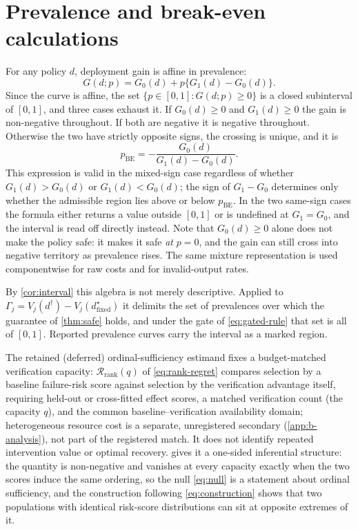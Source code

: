 \section{Prevalence and break-even calculations}
\label{app:estimands}

For any policy $d$, deployment gain is affine in prevalence:
\begin{equation}
 G(d;p)=G_0(d)+p\{G_1(d)-G_0(d)\}.
\end{equation}
Since the curve is affine, the set $\{p\in[0,1]:G(d;p)\ge0\}$ is a closed
subinterval of $[0,1]$, and three cases exhaust it.  If $G_0(d)\ge0$ and
$G_1(d)\ge0$ the gain is non-negative throughout.  If both are negative it is
negative throughout.  Otherwise the two have strictly opposite signs, the
crossing is unique, and it is
\begin{equation}
 p_{\mathrm{BE}}=-\frac{G_0(d)}{G_1(d)-G_0(d)}.
\end{equation}
This expression is valid in the mixed-sign case regardless of whether
$G_1(d)>G_0(d)$ or $G_1(d)<G_0(d)$; the sign of $G_1-G_0$ determines only
whether the admissible region lies above or below $p_{\mathrm{BE}}$.  In the
two same-sign cases the formula either returns a value outside $[0,1]$ or is
undefined at $G_1=G_0$, and the interval is read off directly instead.  Note
that $G_0(d)\ge0$ alone does not make the policy safe: it makes it safe
\emph{at} $p=0$, and the gain can still cross into negative territory as
prevalence rises.  The same mixture representation is used componentwise for raw costs
and for invalid-output rates.

By \cref{cor:interval} this algebra is not merely descriptive.  Applied to
$\Gamma_j=V_j(d^\dagger)-V_j(d^\star_{\mathrm{fixed}})$ it delimits the set of
prevalences over which the guarantee of \cref{thm:safe} holds, and
under the gate of \eqref{eq:gated-rule} that set is all of $[0,1]$.  Reported
prevalence curves carry the interval as a marked region.

The retained (deferred) ordinal-sufficiency estimand fixes a budget-matched verification
capacity: $\mathcal R_{\mathrm{rank}}(q)$ of \eqref{eq:rank-regret} compares
selection by a baseline failure-risk score against selection by the verification
advantage itself, requiring held-out or cross-fitted effect scores, a matched verification
count (the capacity $q$), and the common baseline--verification availability
domain; heterogeneous resource cost is a separate, unregistered secondary
(\cref{app:b-analysis}), not part of the registered match.  It does not identify
repeated intervention value or optimal recovery.   gives it a
one-sided inferential structure: the quantity is non-negative and vanishes at
every capacity exactly when the two scores induce the same ordering, so the null
\eqref{eq:null} is a statement about ordinal sufficiency, and the construction
following \eqref{eq:construction} shows that two populations with identical
risk-score distributions can sit at opposite extremes of it.
